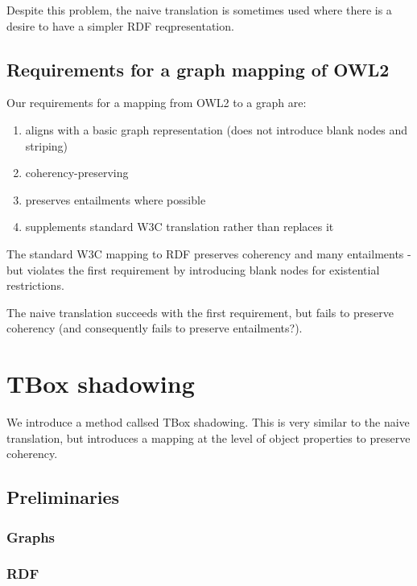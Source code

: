 \documentclass{my}
\begin{document}
Despite this problem, the naive translation is sometimes used where
there is a desire to have a simpler RDF reqpresentation.

\subsection{Requirements for a graph mapping of OWL2}

Our requirements for a mapping from OWL2 to a graph are:

\begin{enumerate}

\item aligns with a basic graph representation (does not introduce
  blank nodes and striping)

\item coherency-preserving

\item preserves entailments where possible

\item supplements standard W3C translation rather than replaces it

\end{enumerate}

The standard W3C mapping to RDF preserves coherency and many
entailments - but violates the first requirement by introducing blank
nodes for existential restrictions.

The naive translation succeeds with the first requirement, but fails
to preserve coherency (and consequently fails to preserve
entailments?). 

\section{TBox shadowing}

We introduce a method callsed TBox shadowing. This is very similar to
the naive translation, but introduces a mapping at the level of object
properties to preserve coherency.

\subsection{Preliminaries}

\subsubsection{Graphs}

\subsubsection{RDF}
\end{document}
